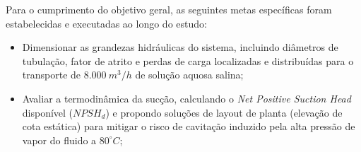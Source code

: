 Para o cumprimento do objetivo geral, as seguintes metas específicas foram estabelecidas e executadas ao longo do estudo:

\begin{itemize}
    \item Dimensionar as grandezas hidráulicas do sistema, incluindo diâmetros de tubulação, fator de atrito e perdas de carga localizadas e distribuídas para o transporte de $8.000~m^3/h$ de solução aquosa salina;
    \item Avaliar a termodinâmica da sucção, calculando o \textit{Net Positive Suction Head} disponível ($NPSH_d$) e propondo soluções de layout de planta (elevação de cota estática) para mitigar o risco de cavitação induzido pela alta pressão de vapor do fluido a $80^\circ C$;
\end{itemize}

